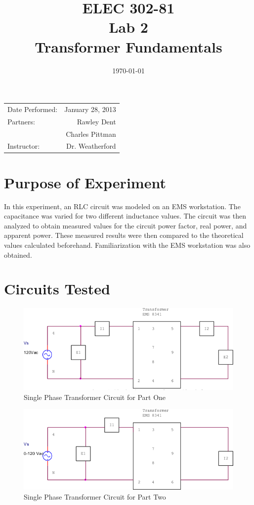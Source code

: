 \documentclass{article}
\title{ELEC 302-81\\ Lab 2\\ Transformer Fundamentals} %
\date{\today} %
\begin{document}
\maketitle

\begin{center}
  \begin{tabular}{lr}
    Date Performed: & January 28, 2013 \\
    Partners: & Rawley Dent \\
              & Charles Pittman \\
    Instructor: & Dr. Weatherford
  \end{tabular}
\end{center}

\pagebreak


\section{Purpose of Experiment}
In this experiment, an RLC circuit was modeled on an EMS workstation.  The
capacitance was varied for two different inductance values. The circuit was
then analyzed to obtain measured values for the circuit power factor, real
power, and apparent power. These measured results were then compared to the
theoretical values calculated beforehand. Familiarization with the EMS
workstation was also obtained.

\section{Circuits Tested}
\begin{figure}[h]
  \centering
  \includegraphics[width=.8\textwidth]{circuit_01}
  \caption{Single Phase Transformer Circuit for Part One}
  \label{fig:circuit_01}
\end{figure}

\begin{figure}[h]
  \centering
  \includegraphics[width=.8\textwidth]{circuit_02}
  \caption{Single Phase Transformer Circuit for Part Two}
  \label{fig:circuit_02}
\end{figure}
\end{document}
